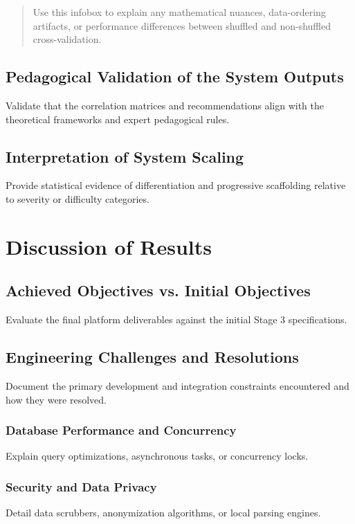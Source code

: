 \documentclass[12pt,a4paper]{report}
\newenvironment{infobox}[1][]{%
  \begin{quote}\small\itshape\color{grisTexte}%
}{%
  \end{quote}%
}
\begin{document}
\begin{infobox}[title={Understanding Exact Match vs. Per-Label Accuracy}]
  Use this infobox to explain any mathematical nuances, data-ordering artifacts, or performance differences between shuffled and non-shuffled cross-validation.
\end{infobox}

\section{Pedagogical Validation of the System Outputs}
Validate that the correlation matrices and recommendations align with the theoretical frameworks and expert pedagogical rules.

\section{Interpretation of System Scaling}
Provide statistical evidence of differentiation and progressive scaffolding relative to severity or difficulty categories.

\chapter{Discussion of Results}
\section{Achieved Objectives vs. Initial Objectives}
Evaluate the final platform deliverables against the initial Stage 3 specifications.

\section{Engineering Challenges and Resolutions}
Document the primary development and integration constraints encountered and how they were resolved.

\subsection{Database Performance and Concurrency}
Explain query optimizations, asynchronous tasks, or concurrency locks.

\subsection{Security and Data Privacy}
Detail data scrubbers, anonymization algorithms, or local parsing engines.
\end{document}
